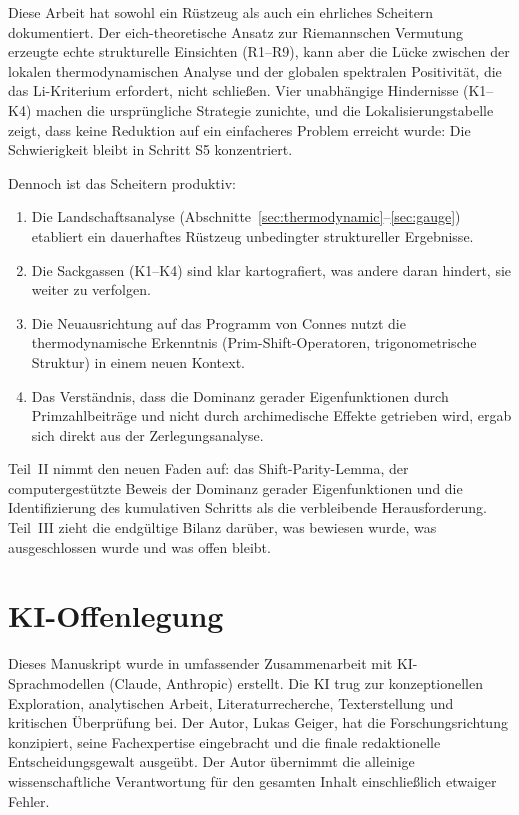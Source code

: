 \documentclass[12pt,a4paper]{article}
\theoremstyle{definition}
\theoremstyle{remark}
\begin{document}
Diese Arbeit hat sowohl ein Rüstzeug als auch ein ehrliches Scheitern dokumentiert. Der eich-theoretische Ansatz zur Riemannschen Vermutung erzeugte echte strukturelle Einsichten (R1--R9), kann aber die Lücke zwischen der lokalen thermodynamischen Analyse und der globalen spektralen Positivität, die das Li-Kriterium erfordert, nicht schließen. Vier unabhängige Hindernisse (K1--K4) machen die ursprüngliche Strategie zunichte, und die Lokalisierungstabelle zeigt, dass keine Reduktion auf ein einfacheres Problem erreicht wurde: Die Schwierigkeit bleibt in Schritt S5 konzentriert.

Dennoch ist das Scheitern produktiv:
\begin{enumerate}
  \item Die Landschaftsanalyse (Abschnitte~\ref{sec:thermodynamic}--\ref{sec:gauge}) etabliert ein dauerhaftes Rüstzeug unbedingter struktureller Ergebnisse.
  \item Die Sackgassen (K1--K4) sind klar kartografiert, was andere daran hindert, sie weiter zu verfolgen.
  \item Die Neuausrichtung auf das Programm von Connes nutzt die thermodynamische Erkenntnis (Prim-Shift-Operatoren, trigonometrische Struktur) in einem neuen Kontext.
  \item Das Verständnis, dass die Dominanz gerader Eigenfunktionen durch Primzahlbeiträge und nicht durch archimedische Effekte getrieben wird, ergab sich direkt aus der Zerlegungsanalyse.
\end{enumerate}

Teil~II nimmt den neuen Faden auf: das Shift-Parity-Lemma, der computergestützte Beweis der Dominanz gerader Eigenfunktionen und die Identifizierung des kumulativen Schritts als die verbleibende Herausforderung. Teil~III zieht die endgültige Bilanz darüber, was bewiesen wurde, was ausgeschlossen wurde und was offen bleibt.


\section*{KI-Offenlegung}

Dieses Manuskript wurde in umfassender Zusammenarbeit mit KI-Sprachmodellen (Claude, Anthropic) erstellt. Die KI trug zur konzeptionellen Exploration, analytischen Arbeit, Literaturrecherche, Texterstellung und kritischen \"Uberpr\"ufung bei. Der Autor, Lukas Geiger, hat die Forschungsrichtung konzipiert, seine Fachexpertise eingebracht und die finale redaktionelle Entscheidungsgewalt ausge\"ubt. Der Autor \"ubernimmt die alleinige wissenschaftliche Verantwortung f\"ur den gesamten Inhalt einschlie\ss{}lich etwaiger Fehler.
\end{document}
